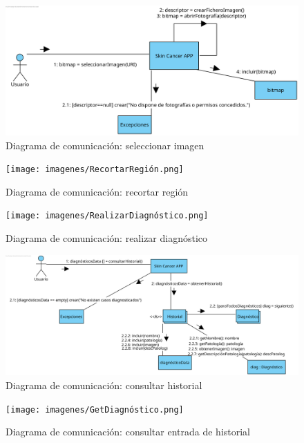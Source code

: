  
\begin{figure}[H]
 	\centering
 	\includegraphics[scale = 0.8]{imagenes/SeleccionarImagen.png}
 	\caption{Diagrama de comunicación: seleccionar imagen}
 	\label{fig:com2}
 \end{figure}
 
\begin{figure}[H]
 	\centering
 	\texttt{[image: imagenes/RecortarRegión.png]}
 	\caption{Diagrama de comunicación: recortar región}
 	\label{fig:com3}
 \end{figure}
 
 \begin{figure}[H]
 	\centering
 	\texttt{[image: imagenes/RealizarDiagnóstico.png]}
 	\caption{Diagrama de comunicación: realizar diagnóstico}
 	\label{fig:com4}
 \end{figure}
 
  \begin{figure}[H]
 	\centering
 	\includegraphics[scale = 0.75]{imagenes/HistorialSec.png}
 	\caption{Diagrama de comunicación: consultar historial}
 	\label{fig:com5}
 \end{figure}
 
 
   \begin{figure}[H]
 	\centering
 	\texttt{[image: imagenes/GetDiagnóstico.png]}
 	\caption{Diagrama de comunicación: consultar entrada de historial}
 	\label{fig:com6}
 \end{figure}